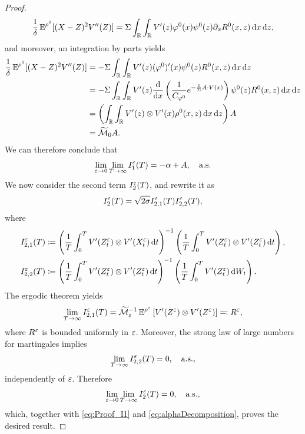 \documentclass[review,onefignum,onetabnum]{siamonline190516}
\begin{document}
\begin{proof}
\begin{equation}\label{eq:final_result}
	\frac{1}{\delta} \E^{\rho^0}[(X - Z)^2 V''(Z)] = \Sigma \int_{\R} \int_{\R} V'(z) \phi^0(x) \psi^0(z) \partial_x R^0(x,z) \dd x \dd z,
\end{equation}
and moreover, an integration by parts yields
\begin{equation}
\begin{aligned}
	\frac{1}{\delta} \operatorname{\mathbb{E}}^{\rho^0}[(X - Z)^2 V''(Z)] &= -\Sigma \int_{\mathbb{R}} \int_{\mathbb{R}} V'(z) (\varphi^0)'(x) \psi^0(z) R^0(x,z) \,\mathrm{d} x \,\mathrm{d} z\\
	&= -\Sigma \int_{\mathbb{R}} \int_{\mathbb{R}} V'(z) \frac{\mathrm{d}}{\mathrm{d} x} \left ( \frac{1}{C_{\varphi^0}} e^{-\frac{1}{\Sigma} A\cdot V(x)} \right ) \psi^0(z) R^0(x,z) \,\mathrm{d} x \,\mathrm{d} z \\
	&= \left(\int_{\mathbb{R}} \int_{\mathbb{R}} V'(z) \otimes V'(x) \rho^0(x,z) \,\mathrm{d} x \,\mathrm{d} z\right)A\\
	&=  \widetilde {\mathcal M}_0 A.
\end{aligned}
\end{equation}
We can therefore conclude that
\begin{equation}\label{eq:Proof_I1}
\lim_{\epl \to 0} \lim_{T \to \infty} I_1^\epl(T) = -\alpha + A, \quad \text{a.s.}
\end{equation}
We now consider the second term $I_2^\varepsilon(T)$, and rewrite it as
\begin{equation}
	I^\varepsilon_2(T) = \sqrt{2\sigma} I_{2,1}^\varepsilon(T)  I_{2,2}^\varepsilon(T),
\end{equation}
where
\begin{equation}
\begin{aligned}
	I_{2,1}^\varepsilon(T) &\coloneqq \left(\frac{1}{T} \int_0^T V'(Z^\varepsilon_t) \otimes V'(X^\varepsilon_t) \,\mathrm{d} t\right)^{-1}\left(\frac{1}{T} \int_0^T V'(Z^\varepsilon_t) \otimes V'(Z^\varepsilon_t) \,\mathrm{d} t\right),\\
	I_{2,2}^\varepsilon(T) &\coloneqq \left(\frac{1}{T} \int_0^T V'(Z^\varepsilon_t) \otimes V'(Z^\varepsilon_t) \,\mathrm{d} t\right)^{-1} \left(\frac1T \int_0^T V'(Z^\varepsilon_t) \,\mathrm{d} W_t\right).
\end{aligned}
\end{equation}
The ergodic theorem yields
\begin{equation}
	\lim_{T \to \infty} I_{2,1}^\varepsilon(T) = \widetilde {\mathcal M}_\varepsilon^{-1}\operatorname{\mathbb{E}}^{\rho^\varepsilon}\left[V'(Z^\varepsilon) \otimes V'(Z^\varepsilon)\right] \eqqcolon R^\varepsilon,
\end{equation}
where $R^\varepsilon$ is bounded uniformly in $\varepsilon$. Moreover, the strong law of large numbers for martingales implies
\begin{equation}
	\lim_{T \to \infty} I_{2,2}^\varepsilon(T) = 0, \quad \text{a.s.},
\end{equation}
independently of $\varepsilon$. Therefore
\begin{equation}
	\lim_{\varepsilon \to 0}\lim_{T \to \infty} I_2^\varepsilon(T) = 0, \quad \text{a.s.},
\end{equation}
which, together with \eqref{eq:Proof_I1} and \eqref{eq:alphaDecomposition}, proves the desired result.
\end{proof}
\end{document}
